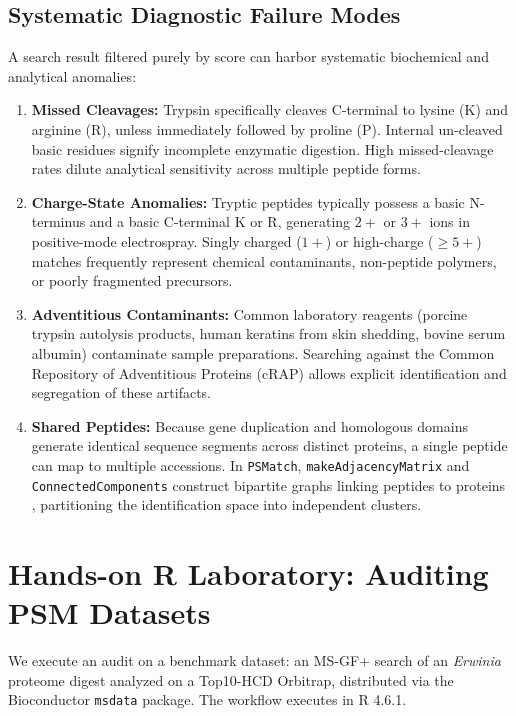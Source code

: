 \documentclass[11pt,twoside,openright]{book}
\begin{document}
\subsection{Systematic Diagnostic Failure Modes}
A search result filtered purely by score can harbor systematic biochemical and analytical anomalies:
\begin{enumerate}
    \item \textbf{Missed Cleavages:} Trypsin specifically cleaves C-terminal to lysine ($\text{K}$) and arginine ($\text{R}$), unless immediately followed by proline ($\text{P}$). Internal un-cleaved basic residues signify incomplete enzymatic digestion. High missed-cleavage rates dilute analytical sensitivity across multiple peptide forms.
    \item \textbf{Charge-State Anomalies:} Tryptic peptides typically possess a basic N-terminus and a basic C-terminal $\text{K}$ or $\text{R}$, generating $2+$ or $3+$ ions in positive-mode electrospray. Singly charged ($1+$) or high-charge ($\ge 5+$) matches frequently represent chemical contaminants, non-peptide polymers, or poorly fragmented precursors.
    \item \textbf{Adventitious Contaminants:} Common laboratory reagents (porcine trypsin autolysis products, human keratins from skin shedding, bovine serum albumin) contaminate sample preparations. Searching against the Common Repository of Adventitious Proteins (cRAP) \cite{mellacheruvu2013crapome} allows explicit identification and segregation of these artifacts.
    \item \textbf{Shared Peptides:} Because gene duplication and homologous domains generate identical sequence segments across distinct proteins, a single peptide can map to multiple accessions. In \texttt{PSMatch}, \texttt{makeAdjacencyMatrix} and \texttt{ConnectedComponents} construct bipartite graphs linking peptides to proteins \cite{nesvizhskii2005interpretation, nesvizhskii2010survey}, partitioning the identification space into independent clusters.
\end{enumerate}

\section{Hands-on R Laboratory: Auditing PSM Datasets}

We execute an audit on a benchmark dataset: an MS-GF+ search of an \textit{Erwinia} proteome digest analyzed on a Top10-HCD Orbitrap, distributed via the Bioconductor \texttt{msdata} package. The workflow executes in R 4.6.1.
\end{document}

